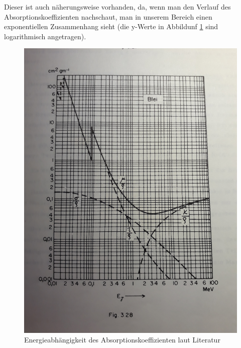 Dieser ist auch näherungsweise vorhanden, da, wenn man den Verlauf des Absorptionskoeffizienten nachschaut, man in unserem Bereich einen 
exponentiellen Zusammenhang sieht (die y-Werte in Abbildunf \ref{AbsLit} sind logarithmisch angetragen).


\begin{figure}
    \centering
    \includegraphics[width = 12cm]{Bilder/Auswertung/AbsMamier.jpg}
    \caption{Energieabhängigkeit des Absorptionskoeffizienten laut Literatur}
    \label{AbsLit}
\end{figure}
